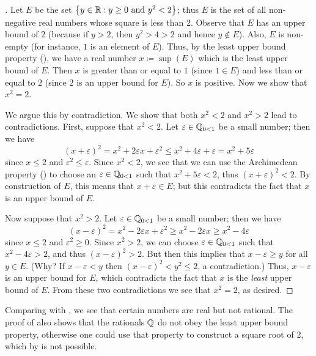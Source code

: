 \begin{proof}[]
  Let \(E\) be the set \(\left\lbrace y \in \mathbb{R} : y \geq 0 \text{ and } y^2 < 2\right\rbrace\);
  thus \(E\) is the set of all non-negative real numbers whose square is less than \(2\).
  Observe that \(E\) has an upper bound of \(2\) (because if \(y > 2\), then \(y^2 > 4 > 2\) and hence \(y \notin E\)).
  Also, \(E\) is non-empty (for instance, \(1\) is an element of \(E\)).
  Thus, by the least upper bound property (), we have a real number \(x \coloneqq \sup(E)\) which is the least upper bound of \(E\).
  Then \(x\) is greater than or equal to \(1\) (since \(1 \in E\)) and less than or equal to \(2\)
  (since \(2\) is an upper bound for \(E\)).
  So \(x\) is positive.
  Now we show that \(x^2 = 2\).

  We argue this by contradiction.
  We show that both \(x^2 < 2\) and \(x^2 > 2\) lead to contradictions.
  First, suppose that \(x^2 < 2\).
  Let \(\varepsilon \in \mathbb{Q}_{0 < 1}\) be a small number;
  then we have
  \[
    (x + \varepsilon)^2 = x^2 + 2\varepsilon x + \varepsilon^2 \leq x^2 + 4\varepsilon + \varepsilon = x^2 + 5\varepsilon
  \]
  since \(x \leq 2\) and \(\varepsilon^2 \leq \varepsilon\).
  Since \(x^2 < 2\), we see that we can use the Archimedean property () to choose an \(\varepsilon \in \mathbb{Q}_{0 < 1}\) such that \(x^2 + 5\varepsilon < 2\), thus \((x + \varepsilon)^2 < 2\).
  By construction of \(E\), this means that \(x + \varepsilon \in E\);
  but this contradicts the fact that \(x\) is an upper bound of \(E\).

  Now suppose that \(x^2 > 2\).
  Let \(\varepsilon \in \mathbb{Q}_{0 < 1}\) be a small number;
  then we have
  \[
    (x - \varepsilon)^2 = x^2 - 2\varepsilon x + \varepsilon^2 \geq x^2 - 2\varepsilon x \geq x^2 - 4\varepsilon
  \]
  since \(x \leq 2\) and \(\varepsilon^2 \geq 0\).
  Since \(x^2 > 2\), we can choose \(\varepsilon \in \mathbb{Q}_{0 < 1}\) such that \(x^2 - 4\varepsilon > 2\), and thus \((x - \varepsilon)^2 > 2\).
  But then this implies that \(x - \varepsilon \geq y\) for all \(y \in E\).
  (Why? If \(x - \varepsilon < y\) then \((x - \varepsilon)^2 < y^2 \leq 2\), a contradiction.)
  Thus, \(x - \varepsilon\) is an upper bound for \(E\), which contradicts the fact that \(x\) is the \emph{least} upper bound of \(E\).
  From these two contradictions we see that \(x^2 = 2\), as desired.
\end{proof}

\begin{rmk}\label{i:5.5.13}
  Comparing  with , we see that certain numbers are real but not rational.
  The proof of  also shows that the rationals \(\mathbb{Q}\) do not obey the least upper bound property, otherwise one could use that property to construct a square root of \(2\), which by  is not possible.
\end{rmk}

